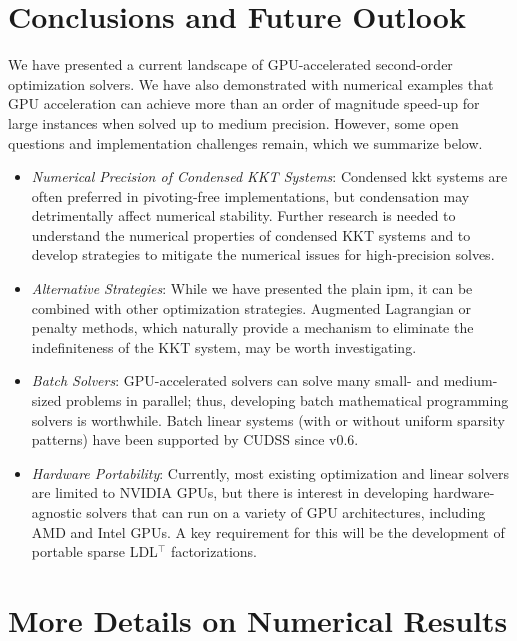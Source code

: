 \documentclass{article}
\begin{document}
\section{Conclusions and Future Outlook}\label{eqn:conclusion}
We have presented a current landscape of GPU-accelerated second-order optimization solvers.
We have also demonstrated with numerical examples that GPU acceleration can achieve more than an order of magnitude speed-up for large instances when solved up to medium precision. However, some open questions and implementation challenges remain, which we summarize below.

\begin{itemize}[leftmargin=*,itemsep=0pt,parsep=0pt,partopsep=0pt]
\item \textit{Numerical Precision of Condensed KKT Systems}: Condensed \gls*{kkt} systems are often preferred in pivoting-free implementations, but condensation may detrimentally affect numerical stability. Further research is needed to understand the numerical properties of condensed KKT systems and to develop strategies to mitigate the numerical issues for high-precision solves.
\item \textit{Alternative Strategies}: While we have presented the plain \gls*{ipm}, it can be combined with other optimization strategies. Augmented Lagrangian or penalty methods, which naturally provide a mechanism to eliminate the indefiniteness of the KKT system, may be worth investigating.
\item \textit{Batch Solvers}: GPU-accelerated solvers can solve many small- and medium-sized problems in parallel; thus, developing batch mathematical programming solvers is worthwhile. Batch linear systems (with or without uniform sparsity patterns) have been supported by CUDSS since v0.6.
\item \textit{Hardware Portability}: Currently, most existing optimization and linear solvers are limited to NVIDIA GPUs, but there is interest in developing hardware-agnostic solvers that can run on a variety of GPU architectures, including AMD and Intel GPUs. A key requirement for this will be the development of portable sparse LDL$^\top$ factorizations.
\end{itemize}





\appendix
{}

\section{More Details on Numerical Results}\label{apx:num}
\end{document}
